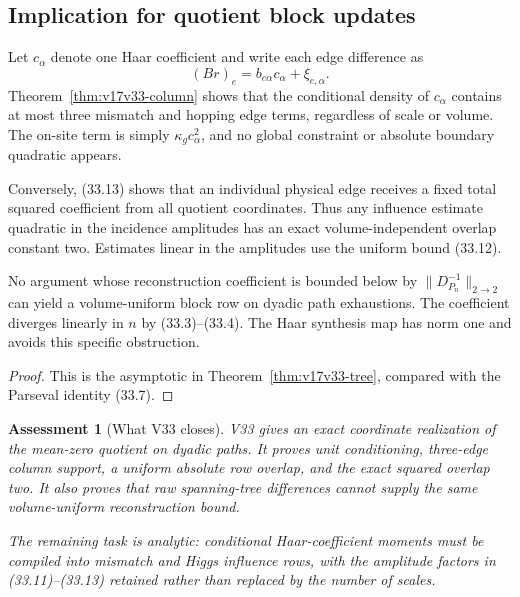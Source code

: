 \documentclass[11pt]{article}
\newtheorem{assessment}[theorem]{Assessment}
\theoremstyle{remark}
\begin{document}
\subsection{Implication for quotient block updates}

Let \(c_\alpha\) denote one Haar coefficient and write each edge
difference as
\[
 (Br)_e=b_{e\alpha}c_\alpha+\xi_{e,\alpha}.        \tag{33.15}
\]
Theorem~\ref{thm:v17v33-column} shows that the conditional density of
\(c_\alpha\) contains at most three mismatch and hopping edge terms,
regardless of scale or volume.  The on-site term is simply
\(\kappa_gc_\alpha^2\), and no global constraint or absolute boundary
quadratic appears.

Conversely, (33.13) shows that an individual physical edge receives a
fixed total squared coefficient from all quotient coordinates.  Thus
any influence estimate quadratic in the incidence amplitudes has an
exact volume-independent overlap constant two.  Estimates linear in
the amplitudes use the uniform bound (33.12).

\begin{countertheorem}
\label{ctr:v17v33-tree}
No argument whose reconstruction coefficient is bounded below by
\(\|D_{P_n}^{-1}\|_{2\to2}\) can yield a volume-uniform block row on
dyadic path exhaustions.  The coefficient diverges linearly in \(n\)
by (33.3)--(33.4).  The Haar synthesis map has norm one and avoids this
specific obstruction.
\end{countertheorem}

\begin{proof}
This is the asymptotic in Theorem~\ref{thm:v17v33-tree}, compared with
the Parseval identity (33.7).
\end{proof}

\begin{assessment}[What V33 closes]
\label{ass:v17v33-status}
V33 gives an exact coordinate realization of the mean-zero quotient on
dyadic paths.  It proves unit conditioning, three-edge column support,
a uniform absolute row overlap, and the exact squared overlap two.  It
also proves that raw spanning-tree differences cannot supply the same
volume-uniform reconstruction bound.

The remaining task is analytic: conditional Haar-coefficient moments
must be compiled into mismatch and Higgs influence rows, with the
amplitude factors in (33.11)--(33.13) retained rather than replaced by
the number of scales.
\end{assessment}
\end{document}
